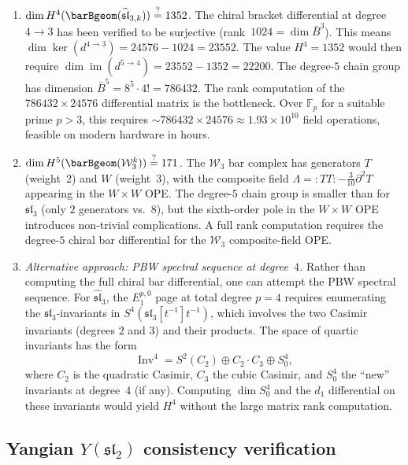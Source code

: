 \begin{enumerate}[label=\textbf{NF-\arabic*$'$.}, leftmargin=3em]
\item \emph{$\dim H^4(\barBgeom(\widehat{\mathfrak{sl}}_{3,k}))
\stackrel{?}{=} 1352$.}
The chiral bracket differential at degree~$4 \to 3$ has been verified
to be surjective (rank~$1024 = \dim \bar{B}^3$).
This means $\dim \ker(d^{4 \to 3}) = 24576 - 1024 = 23552$.
The value $H^4 = 1352$ would then require
$\dim \operatorname{im}(d^{5 \to 4}) = 23552 - 1352 = 22200$.
The degree-$5$ chain group has dimension
$\bar{B}^5 = 8^5 \cdot 4! = 786432$.
The rank computation of the $786432 \times 24576$ differential matrix
is the bottleneck. Over $\mathbb{F}_p$ for a suitable prime $p > 3$,
this requires $\sim 786432 \times 24576 \approx 1.93 \times 10^{10}$
field operations, feasible on modern hardware in hours.

\item \emph{$\dim H^5(\barBgeom(\mathcal{W}_3^k))
\stackrel{?}{=} 171$.}
The $\mathcal{W}_3$ bar complex has generators $T$ (weight~$2$) and
$W$ (weight~$3$), with the composite field $\Lambda = {:}TT{:} -
\tfrac{3}{10}\partial^2 T$ appearing in the $W \times W$ OPE.
The degree-$5$ chain group is smaller than for $\mathfrak{sl}_3$
(only $2$ generators vs.~$8$), but the sixth-order pole in the
$W \times W$ OPE introduces non-trivial complications.
A full rank computation requires the degree-$5$ chiral bar differential
for the $\mathcal W_3$ composite-field OPE.

\item \emph{Alternative approach: PBW spectral sequence at degree~$4$.}
Rather than computing the full chiral bar differential, one can
attempt the PBW spectral sequence. For $\widehat{\mathfrak{sl}}_3$,
the $E_1^{p,0}$ page at total degree $p = 4$ requires enumerating
the $\mathfrak{sl}_3$-invariants in
$S^4(\mathfrak{sl}_3[t^{-1}]t^{-1})$, which involves the two Casimir
invariants (degrees $2$ and $3$) and their products. The space of
quartic invariants has the form
\[
\operatorname{Inv}^4 = S^2(C_2) \oplus C_2 \cdot C_3 \oplus S^4_0,
\]
where $C_2$ is the quadratic Casimir, $C_3$ the cubic Casimir,
and $S^4_0$ the ``new'' invariants at degree~$4$ (if any).
Computing $\dim S^4_0$ and the $d_1$ differential on these invariants
would yield $H^4$ without the large matrix rank computation.
\end{enumerate}

\subsection{Yangian $Y(\mathfrak{sl}_2)$ consistency verification}
\label{subsec:yangian-h4-verification}

